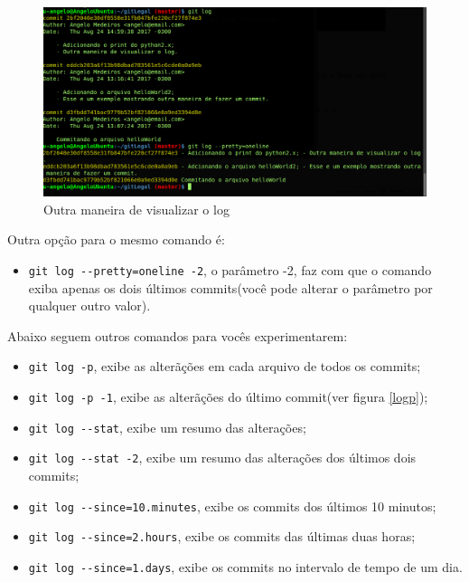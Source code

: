 \documentclass[12pt,openright,oneside,a4paper,english,brazil]{abntex2}
\begin{document}
\begin{figure}[h]
	\caption{\label{pretty}Outra maneira de visualizar o log}
	\begin{center}
		\includegraphics[width=1\linewidth]{imagens/pretty}
	\end{center}
\end{figure}

Outra opção para o mesmo comando é:

\begin{itemize}
	\item \verb|git log --pretty=oneline -2|, o parâmetro -2, faz com que o comando exiba apenas os dois últimos commits(você pode alterar o parâmetro por qualquer outro valor).
\end{itemize}

Abaixo seguem outros comandos para vocês experimentarem:

\begin{itemize}
	\item \verb|git log -p|, exibe as alterãções em cada arquivo de todos os commits;
	\item \verb|git log -p -1|, exibe as alterãções do último commit(ver figura \ref{logp});
	\item \verb|git log --stat|, exibe um resumo das alterações;
	\item \verb|git log --stat -2|, exibe um resumo das alterações dos últimos dois commits;
	\item \verb|git log --since=10.minutes|, exibe os commits dos últimos 10 minutos;
	\item \verb|git log --since=2.hours|, exibe os commits das últimas duas horas;
	\item \verb|git log --since=1.days|, exibe os commits no intervalo de tempo de um dia.
\end{itemize}
\end{document}
